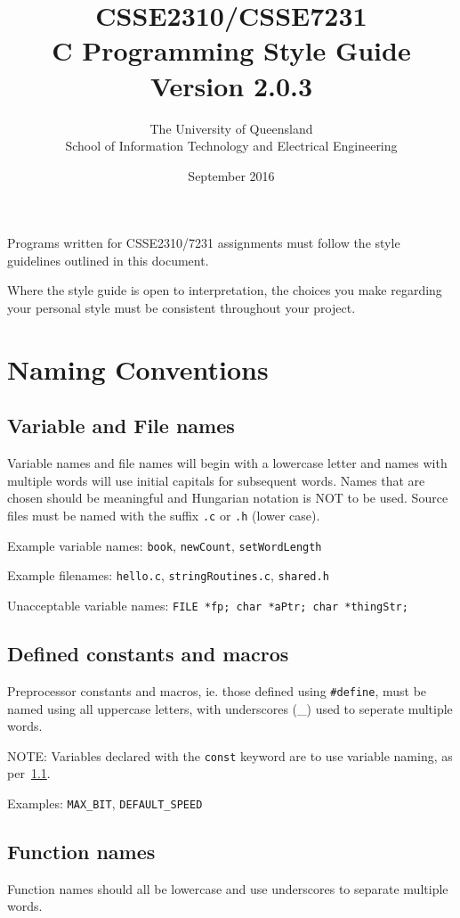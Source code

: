 \documentclass{article}
\title{CSSE2310/CSSE7231\\C Programming Style Guide\\Version 2.0.3}
\author{The University of Queensland\\School of Information Technology and Electrical Engineering}
\date{September 2016}
\begin{document}
\maketitle

Programs written for CSSE2310/7231 assignments must follow the style guidelines outlined in this document.

Where the style guide is open to interpretation, the choices you make regarding your personal style must be consistent throughout your project.

\section{Naming Conventions}
\subsection{Variable and File names}
\label{sec:naming-variable}
Variable names and file names will begin with a lowercase letter and names with multiple words will use initial capitals for subsequent words.
Names that are chosen should be meaningful and Hungarian notation is NOT to be used.
Source files must be named with the suffix \texttt{.c} or \texttt{.h} (lower case).

Example variable names: \texttt{book}, \texttt{newCount}, \texttt{setWordLength}

Example filenames: \texttt{hello.c}, \texttt{stringRoutines.c}, \texttt{shared.h}

Unacceptable variable names: \texttt{FILE *fp; char *aPtr; char *thingStr;}

\subsection{Defined constants and macros}
\label{sec:naming-constants}
Preprocessor constants and macros, ie. those defined using \texttt{\#define}, must be named using all uppercase letters, with underscores (\_) used to seperate multiple words.

NOTE: Variables declared with the \texttt{const} keyword are to use variable naming, as per~\ref{sec:naming-variable}.

Examples: \texttt{MAX\_BIT}, \texttt{DEFAULT\_SPEED}

\subsection{Function names}
Function names should all be lowercase and use underscores to separate multiple words.
\end{document}
